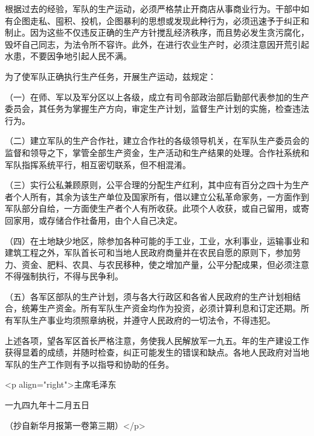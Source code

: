 根据过去的经验，军队的生产运动，必须严格禁止开商店从事商业行为。干部中如有企图走私、囤积、投机，企图暴利的思想或发现此种行为，必须迅速予于纠正和制止。因为这些不仅违反正确的生产方针搅乱经济秩序，而且势必发生贪污腐化，毁坏自己同志，为法令所不容许。此外，在进行农业生产时，必须注意因开荒引起水患，不要因争地引起人民不满。

为了使军队正确执行生产任务，开展生产运动，兹规定：

（一）在师、军以及军分区以上各级，成立有司令部政治部后勤部代表参加的生产委员会，其任务为掌握生产方向，审定生产计划，监督生产计划的实施，检查违法行为。

（二）建立军队的生产合作社，建立合作社的各级领导机关，在军队生产委员会的监督和领导之下，掌管全部生产资金，生产活动和生产结果的处理。合作社系统和军队指挥系统平行，相互密切联系，但不相混淆。

（三）实行公私兼顾原则，公平合理的分配生产红利，其中应有百分之四十为生产者个人所有，其余为该生产单位及国家所有，借以建立公私革命家务，一方面作到军队部分自给，一方面使生产者个人有所收获。此项个人收获，或自己留用，或寄回家用，或存储合作社备用，由个人自己决定。

（四）在土地缺少地区，除参加各种可能的手工业，工业，水利事业，运输事业和建筑工程之外，军队首长可和当地人民政府商量并在农民自愿的原则下，参加劳力、资金、肥料、农具、与农民移种，使之增加产量，公平分配成果，但必须注意不得强制执行，不得与民争利。

（五）各军区部队的生产计划，须与各大行政区和各省人民政府的生产计划相结合，统筹生产资金。所有军队生产资金均作为投资，必须计算利息和订定还期。所有军队生产事业均须照章纳税，并遵守人民政府的一切法令，不得违犯。

上述各项，望各军区首长严格注意，务使我人民解放军一九五。年的生产建设工作获得显着的成绩，并随时检查，纠正可能发生的错误和缺点。各地人民政府对当地军队的生产工作则有予以指导和协助的任务。

<p align="right">主席毛泽东

一九四九年十二月五日

（抄自新华月报第一卷第三期）</p>



